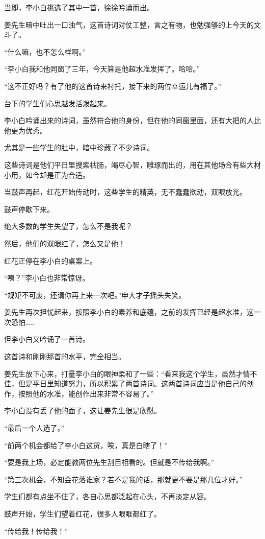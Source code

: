 \begin{this_body}
当即，李小白挑选了其中一首，徐徐吟诵而出。

姜先生暗中吐出一口浊气，这首诗词对仗工整，言之有物，也勉强够的上今天的文斗了。

“什么嘛，也不怎么样啊。”

“李小白我和他同窗了三年，今天算是他超水准发挥了。哈哈。”

“这不正好吗？有了他的这首诗来衬托，接下来的两位幸运儿有福了。”

台下的学生们心思越发活泼起来。

李小白吟诵出来的诗词，虽然符合他的身份，但在他的同窗里面，还有大把的人比他更为优秀。

尤其是一些学生的肚中，暗中珍藏了不少诗词。

这些诗词是他们平日里搜索枯肠，竭尽心智，雕琢而出的，用在其他场合有些大材小用，如今却是正为合适。

当鼓声再起，红花开始传动时，这些学生的精英，无不蠢蠢欲动，双眼放光。

鼓声停歇下来。

绝大多数的学生失望了，怎么不是我呢？

然后，他们的双眼红了，怎么又是他！

红花正停在李小白的桌案上。

“咦？”李小白也非常惊讶。

“规矩不可废，还请你再上来一次吧。”申大才子摇头失笑。

姜先生再次担忧起来，按照李小白的素养和底蕴，之前的发挥已经是超水准，这一次恐怕……

但李小白又吟诵了一首诗。

这首诗和刚刚那首的水平，完全相当。

姜先生放下心来，打量李小白的眼神柔和了一些：“看来我这个学生，虽然才情不佳，但是平日里知道努力，所以积累了两首诗词。这两首诗词应当是他自己的创作，按照他的水准，能创作出来非常不容易了。”

李小白没有丢了他的面子，这让姜先生很是欣慰。

“最后一个人选了。”

“前两个机会都给了李小白这货，唉，真是白瞎了！”

“要是我上场，必定能教两位先生刮目相看的。但就是不传给我啊。”

“第三次机会，不知会花落谁家？若不是我的话，那就更不要是那几位才好。”

学生们都有点坐不住了，各自心思都泛起在心头，不再淡定从容。

鼓声开始，学生们望着红花，很多人眼眶都红了。

“传给我！传给我！”


\end{this_body}
